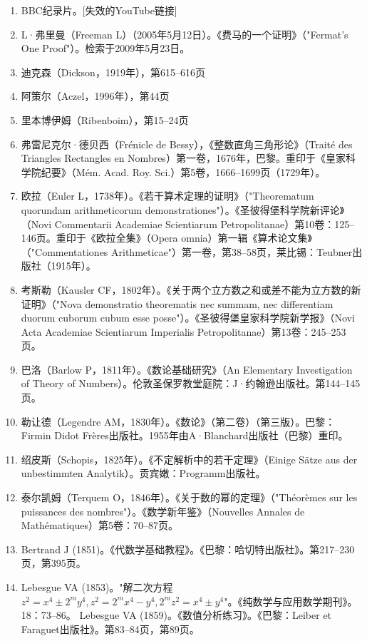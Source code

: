 \begin{enumerate}
\item BBC纪录片。[失效的YouTube链接]
\item L·弗里曼（Freeman L）（2005年5月12日）。《费马的一个证明》（"Fermat's One Proof"）。检索于2009年5月23日。
\item 迪克森（Dickson，1919年），第615–616页
\item 阿策尔（Aczel，1996年），第44页
\item 里本博伊姆（Ribenboim），第15–24页
\item 弗雷尼克尔·德贝西（Frénicle de Bessy），《整数直角三角形论》（Traité des Triangles Rectangles en Nombres）第一卷，1676年，巴黎。重印于《皇家科学院纪要》（Mém. Acad. Roy. Sci.）第5卷，1666–1699页（1729年）。
\item 欧拉（Euler L，1738年）。《若干算术定理的证明》（"Theorematum quorundam arithmeticorum demonstrationes"）。《圣彼得堡科学院新评论》（Novi Commentarii Academiae Scientiarum Petropolitanae）第10卷：125–146页。重印于《欧拉全集》（Opera omnia）第一辑《算术论文集》（"Commentationes Arithmeticae"）第一卷，第38–58页，莱比锡：Teubner出版社（1915年）。
\item 考斯勒（Kausler CF，1802年）。《关于两个立方数之和或差不能为立方数的新证明》（"Nova demonstratio theorematis nec summam, nec differentiam duorum cuborum cubum esse posse"）。《圣彼得堡皇家科学院新学报》（Novi Acta Academiae Scientiarum Imperialis Petropolitanae）第13卷：245–253页。
\item 巴洛（Barlow P，1811年）。《数论基础研究》（An Elementary Investigation of Theory of Numbers）。伦敦圣保罗教堂庭院：J·约翰逊出版社。第144–145页。
\item 勒让德（Legendre AM，1830年）。《数论》（第二卷）（第三版）。巴黎：Firmin Didot Frères出版社。1955年由A·Blanchard出版社（巴黎）重印。
\item 绍皮斯（Schopis，1825年）。《不定解析中的若干定理》（Einige Sätze aus der unbestimmten Analytik）。贡宾嫩：Programm出版社。
\item 泰尔凯姆（Terquem O，1846年）。《关于数的幂的定理》（"Théorèmes sur les puissances des nombres"）。《数学新年鉴》（Nouvelles Annales de Mathématiques）第5卷：70–87页。
\item Bertrand J (1851)。《代数学基础教程》。《巴黎：哈切特出版社》。第217–230页，第395页。  
\item Lebesgue VA (1853)。"解二次方程 \( z^2 = x^4 \pm 2^my^4, z^2 = 2^mx^4 - y^4, 2^mz^2 = x^4 \pm y^4 \)"。《纯数学与应用数学期刊》。18：73–86。  
Lebesgue VA (1859)。《数值分析练习》。《巴黎：Leiber et Faraguet出版社》。第83–84页，第89页。  

\end{enumerate}
